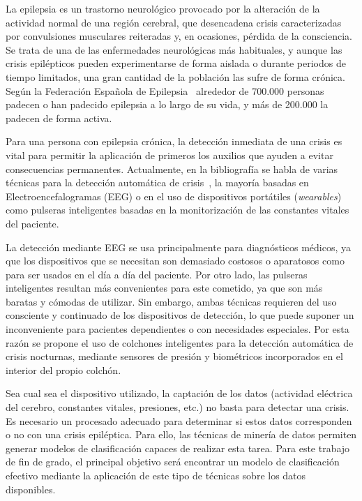 
La epilepsia es un trastorno neurológico provocado por la alteración de la actividad normal de una región cerebral, que desencadena crisis caracterizadas por convulsiones musculares reiteradas y, en ocasiones, pérdida de la consciencia. Se trata de una de las enfermedades neurológicas más habituales, y aunque las crisis epilépticos pueden experimentarse de forma aislada o durante periodos de tiempo limitados, una gran cantidad de la población las sufre de forma crónica. Según la Federación Española de Epilepsia~\cite{fed_esp_epilepsia} alrededor de 700.000 personas padecen o han padecido epilepsia a lo largo de su vida, y más de 200.000 la padecen de forma activa. 

Para una persona con epilepsia crónica, la detección inmediata de una crisis es vital para permitir la aplicación de primeros los auxilios que ayuden a evitar consecuencias permanentes. Actualmente, en la bibliografía se habla de varias técnicas para la detección automática de crisis~\cite{ramgopal2014epilepsy,tzallas2012automated}, la mayoría basadas en Electroencefalogramas (EEG) o en el uso de dispositivos portátiles (\textit{wearables}) como pulseras inteligentes basadas en la monitorización de las constantes vitales del paciente. 

La detección mediante EEG se usa principalmente para diagnósticos médicos, ya que los dispositivos que se necesitan son demasiado costosos o aparatosos como para ser usados en el día a día del paciente. Por otro lado, las pulseras inteligentes resultan más convenientes para este cometido, ya que son más baratas y cómodas de utilizar. Sin embargo, ambas técnicas requieren del uso consciente y continuado de los dispositivos de detección, lo que puede suponer un inconveniente para pacientes dependientes o con necesidades especiales. Por esta razón se propone el uso de colchones inteligentes para la detección automática de crisis nocturnas, mediante sensores de presión y biométricos incorporados en el interior del propio colchón. 

Sea cual sea el dispositivo utilizado, la captación de los datos (actividad eléctrica del cerebro, constantes vitales, presiones, etc.) no basta para detectar una crisis. Es necesario un procesado adecuado para determinar si estos datos corresponden o no con una crisis epiléptica. Para ello, las técnicas de minería de datos permiten generar modelos de clasificación capaces de realizar esta tarea. Para este trabajo de fin de grado, el principal objetivo será encontrar un modelo de clasificación efectivo mediante la aplicación de este tipo de técnicas sobre los datos disponibles.

